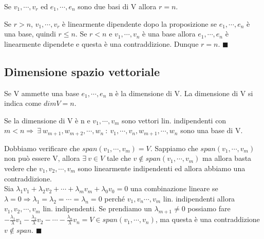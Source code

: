 \begin{corollary}
Se $v_1, \cdots, v_r$ ed $e_1, \cdots, e_n$ sono due basi di V allora $r=n$.
\end{corollary}

\begin{demostration}
Se $r>n$, $v_1, \cdots, v_r$ è linearmente dipendente dopo la proposizione se $e_1, \cdots, e_n$ è una base, quindi $r\leq n$. Se $r<n$ e $v_1, \cdots, v_n$ è una base allora $e_1, \cdots, e_n$ è linearmente dipendete e questa è una contraddizione. Dunque $r=n$. $\blacksquare$
\end{demostration}

\subsection{Dimensione spazio vettoriale}
\begin{definition}[Dimensione di un V]
Se V ammette una base $e_1, \cdots, e_n$ n è la dimensione di V. La dimensione di V si indica come $dim V = n$.
\end{definition}

\begin{corollary}
Se la dimensione di V è n e $v_1, \cdots, v_m$ sono vettori lin. indipendenti con $m<n \Longrightarrow \:\exists\: w_{m+1}, w_{m+2}, \cdots, w_n \::\: v_1, \cdots, v_n, w_{m+1}, \cdots, w_n$ sono una base di V. 
\end{corollary}

\begin{demostration}
Dobbiamo verificare che $span(v_1, \cdots, v_m) = V$. Sappiamo che $span(v_1, \cdots, v_m)$ non può essere V, allora $\exists\: v \in V$ tale che $v \notin span(v_1, \cdots, v_m)$ ma allora basta vedere che $v_1, v_2, \cdots, v_m$ sono linearmente indipendenti ed allora abbiamo una contraddizione.\\
Sia $\lambda_1v_1 + \lambda_2v_2 + \cdots + \lambda_mv_m + \lambda_0v_0 = 0$ una combinazione lineare se $\lambda=0 \Longrightarrow \lambda_1 = \lambda_2 = \cdots = \lambda_n = 0$ perché $v_1, v_n \cdots, v_m$ lin. indipendenti allora $v_1, v_2, \cdots, v_m$ lin. indipendenti. Se prendiamo un $\lambda_{m+1}\neq 0$ possiamo fare $-\frac{\lambda_1}{\lambda}v_1 - \frac{\lambda_2}{\lambda}v_2 - \cdots - \frac{\lambda_n}{\lambda}v_n = V \in span(v_1, \cdots, v_n)$, ma questa è una contraddizione $v \notin span$. $\blacksquare$
\end{demostration}

